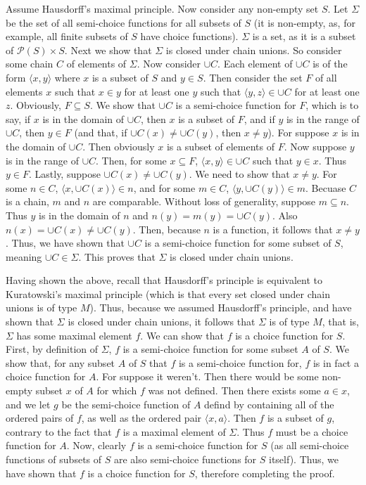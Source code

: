 \documentclass{article}
\theoremstyle{definition}
\begin{document}
Assume Hausdorff's maximal principle. Now consider any non-empty set $S$. Let $\Sigma$ be the set of all semi-choice functions for all subsets of $S$ (it 
is non-empty, as, for example, all finite subsets of $S$ have choice functions). 
$\Sigma$ is a set, as it is a subset of $\mathcal{P}(S)\times S$. Next we show that $\Sigma$ is closed under chain unions. So 
consider some chain $C$ of elements of $\Sigma$. Now consider $\cup C$. Each element of $\cup C$ is of the form 
$\langle x,y\rangle $ where $x$ is a subset of $S$ and $y\in S$. Then consider the set $F$ of all elements $x$ such that 
$x\in y$ for at least one $y$ such that $\langle y,z\rangle\in\cup C$ for at least one $z$. Obviously, $F\subseteq S$. We show that 
$\cup C$ is a semi-choice function for $F$, which is to say, if $x$ is in the domain of $\cup C$, then $x$ is a subset of $F$, and if 
$y$ is in the range of $\cup C$, then $y\in F$ (and that, if 
$\cup C(x)\ne\cup C(y)$, then $x\ne y$). 
For suppose $x$ is in the domain of $\cup C$. Then obviously $x$ is a subset of elements of $F$. Now suppose $y$ is in the range of 
$\cup C$. Then, for some $x\subseteq F$, $\langle x,y\rangle\in\cup C$ such that $y\in x$. Thus $y\in F$. Lastly, 
suppose $\cup C(x)\ne\cup C(y)$. We need to show that $x\ne y$. For some $n\in C$, $\langle x,\cup C(x)\rangle\in n$, and for some
$m\in C$, $\langle y,\cup C(y)\rangle\in m$. Becuase $C$ is a chain, $m$ and $n$ are comparable. Without loss of generality, 
suppose $m\subseteq n$. Thus $y$ is in the domain of $n$ and $n(y)=m(y)=\cup C(y)$. Also 
$n(x)=\cup C(x)\ne\cup C(y)$. Then, because $n$ is a function, it follows that $x\ne y$. Thus, we have shown that 
$\cup C$ is a semi-choice function for some subset of $S$, meaning $\cup C\in\Sigma$. This proves that $\Sigma$ is closed under chain 
unions.

Having shown the above, recall that Hausdorff's principle is equivalent to Kuratowski's maximal principle (which is that 
every set closed under chain unions is of type $M$). Thus, because we assumed Hausdorff's principle, and have shown that 
$\Sigma$ is closed under chain unions, it follows that $\Sigma$ is of type $M$, that is, $\Sigma$ has some maximal element 
$f$. We can show that $f$ is a choice function for $S$. First, by definition of $\Sigma$, $f$ is a semi-choice function for
some subset $A$ of $S$. We show that, for any subset $A$ of $S$ that $f$ is a semi-choice function for, 
$f$ is in fact a choice function for $A$. For suppose it weren't. Then there would be some non-empty subset $x$ of 
$A$ for which $f$ was not defined. Then there exists some $a\in x$, and we let $g$ be the semi-choice function of $A$ 
defind by containing all of the ordered pairs of $f$, as well as the ordered pair $\langle x,a\rangle$. 
Then $f$ is a subset of $g$, contrary to the fact that $f$ is a maximal element of $\Sigma$. Thus 
$f$ must be a choice function for $A$. Now, clearly $f$ is a semi-choice function for $S$ (as all semi-choice functions of 
subsets of $S$ are also semi-choice functions for $S$ itself). Thus, we have shown that $f$ is a choice function for $S$, 
therefore completing the proof.
\end{document}
